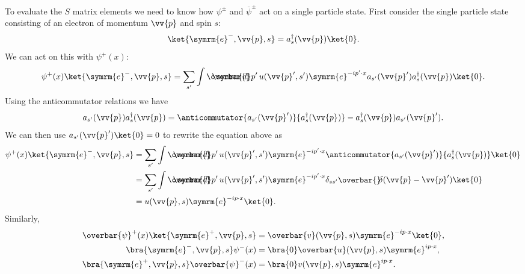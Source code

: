 \documentclass[fleqn]{NotesClass}
\makeatletter
\newcommand{\@particlefont}{\symrm}
\newcommand{\Pe}{\ensuremath{\@particlefont{e}^{-}}}
\newcommand{\APe}{\ensuremath{\@particlefont{e}^{+}}}
\newcommand{\e}{\symrm{e}}
\newcommand{\hermit}{{\dagger}}
\newcommand{\dbar}[1][0.0]{\ThisStyle{\ensurestackMath{%
            \stackengine{#1\LMex}{\SavedStyle \symrm{d}}{\SavedStyle\overbar{}%
                \mkern2.25mu}{O}{r}{F}{F}{L}}}}
\newcommand{\invariantmeasure}[1]{%
    \mathchoice{\dbar #1}{\dbar #1}{\dbar[.05] #1}{\dbar[.06] #1}
}
\newcommand\bardelta{\ThisStyle{\ensurestackMath{%
            \stackengine{-.3\LMpt}{\SavedStyle \delta}{\SavedStyle\overbar{}%
                \mkern4.5mu}{O}{r}{F}{F}{L}}}}
\newcommand{\diracadjoint}[1]{\overbar{#1}}
\makeatother
\begin{document}
    To evaluate the \(S\) matrix elements we need to know how \(\psi^{\pm}\) and \(\diracadjoint{\psi}^{\pm}\) act on a single particle state.
    First consider the single particle state consisting of an electron of momentum \(\vv{p}\) and spin \(s\):
    \begin{equation}
        \ket{\Pe, \vv{p}, s} = a_s^\hermit(\vv{p}) \ket{0}.
    \end{equation}
    We can act on this with \(\psi^+(x)\):
    \begin{equation}
        \psi^+(x) \ket{\Pe, \vv{p}, s} = \sum_{s'} \int \invariantmeasure{p'} \, u(\vv{p}', s') \e^{-ip'\cdot x} a_{s'}(\vv{p}') a_{s}^\hermit(\vv{p}) \ket{0}.
    \end{equation}
    Using the anticommutator relations we have
    \begin{equation}
        a_{s'}(\vv{p}) a_{s}^\hermit(\vv{p}) = \anticommutator{a_{s'}(\vv{p}')}{a_{s}^\hermit(\vv{p})} - a_{s}^\hermit(\vv{p}) a_{s'}(\vv{p}').
    \end{equation}
    We can then use \(a_{s'}(\vv{p}') \ket{0} = 0\) to rewrite the equation above as
    \begin{align}
        \psi^+(x) \ket{\Pe, \vv{p}, s} &= \sum_{s'} \int \invariantmeasure{p'} \, u(\vv{p}', s') \e^{-ip'\cdot x} \anticommutator{a_{s'}(\vv{p}')}{a_s^\hermit(\vv{p})} \ket{0}\\
        &= \sum_{s'} \int \invariantmeasure{p'} \, u(\vv{p}', s') \e^{-ip'\cdot x} \delta_{ss'} \bardelta(\vv{p} - \vv{p}') \ket{0}\\
        &= u(\vv{p}, s) \e^{-ip\cdot x} \ket{0}.
    \end{align}
    Similarly,
    \begin{align}
        \diracadjoint{\psi}^+(x) \ket{\APe, \vv{p}, s} &= \diracadjoint{v}(\vv{p}, s) \e^{-ip\cdot x} \ket{0},\\
        \bra{\Pe, \vv{p}, s}\psi^-(x) &= \bra{0} \diracadjoint{u}(\vv{p}, s) \e^{ip\cdot x},\\
        \bra{\APe, \vv{p}, s}\diracadjoint{\psi}^-(x) &= \bra{0} v(\vv{p}, s) \e^{ip\cdot x}.
    \end{align}
    
\end{document}

